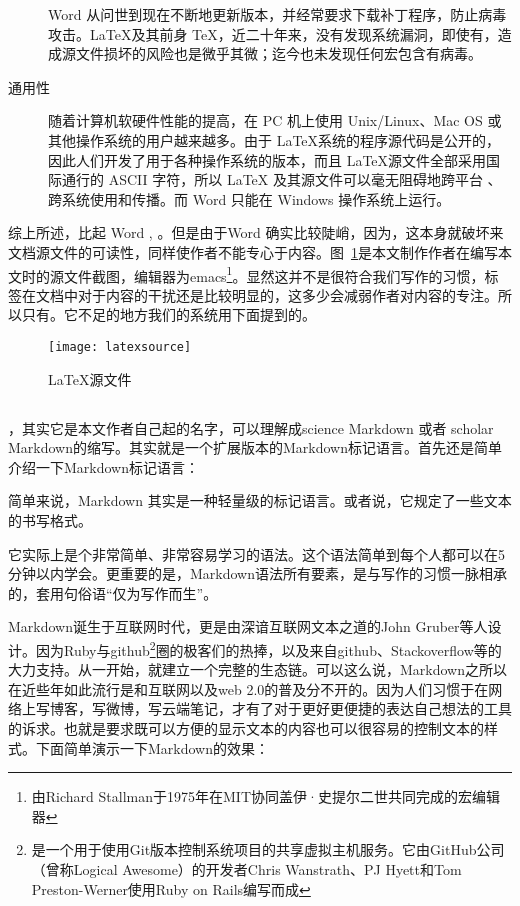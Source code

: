 \begin{description}
Word 从问世到现在不断地更新版本，并经常要求下载补丁程序，防止病毒攻击。\LaTeX 及其前身 \TeX，近二十年来，没有发现系统漏洞，即使有，造成源文件损坏的风险也是微乎其微；迄今也未发现任何宏包含有病毒。
\item[通用性] 随着计算机软硬件性能的提高，在 PC 机上使用 Unix/Linux、Mac OS 或其他操作系统的用户越来越多。由于 \LaTeX 系统的程序源代码是公开的，因此人们开发了用于各种操作系统的版本，而且 \LaTeX 源文件全部采用国际通行的 ASCII 字符，所以 LaTeX 及其源文件可以毫无阻碍地跨平台 、跨系统使用和传播。而 Word 只能在 Windows 操作系统上运行。
\end{description}
综上所述，比起 Word , 。但是由于 Word 确实比较陡峭，因为，这本身就破坏来文档源文件的可读性，同样使作者不能专心于内容。图~\ref{fig:xfig6}是本文制作作者在编写本文时的源文件截图，编辑器为emacs\footnote{由Richard Stallman于1975年在MIT协同盖伊·史提尔二世共同完成的宏编辑器}。显然这并不是很符合我们写作的习惯，标签在文档中对于内容的干扰还是比较明显的，这多少会减弱作者对内容的专注。所以只有。它不足的地方我们的系统用下面提到的。
\begin{figure}[H]
  \centering
  \texttt{[image: latexsource]}
  \caption{LaTeX源文件}
  \label{fig:xfig6}
\end{figure}

\subsection{\smarkdown}
\label{sec:smarkdown}

，其实它是本文作者自己起的名字，可以理解成science Markdown 或者 scholar Markdown的缩写。其实就是一个扩展版本的Markdown标记语言。首先还是简单介绍一下Markdown\cite{abari2012reproducible,rantakari2011adapting}标记语言：

简单来说，Markdown 其实是一种轻量级的标记语言。或者说，它规定了一些文本的书写格式。

它实际上是个非常简单、非常容易学习的语法。这个语法简单到每个人都可以在5分钟以内学会。更重要的是，Markdown语法所有要素，是与写作的习惯一脉相承的，套用句俗语“仅为写作而生”。

Markdown诞生于互联网时代，更是由深谙互联网文本之道的John Gruber等人设计。因为Ruby与github\footnote{是一个用于使用Git版本控制系统项目的共享虚拟主机服务。它由GitHub公司（曾称Logical Awesome）的开发者Chris Wanstrath、PJ Hyett和Tom Preston-Werner使用Ruby on Rails编写而成}圈的极客们的热捧，以及来自github、Stackoverflow等的大力支持。从一开始，就建立一个完整的生态链。可以这么说，Markdown之所以在近些年如此流行是和互联网以及web 2.0的普及分不开的。因为人们习惯于在网络上写博客，写微博，写云端笔记，才有了对于更好更便捷的表达自己想法的工具的诉求。也就是要求既可以方便的显示文本的内容也可以很容易的控制文本的样式。下面简单演示一下Markdown的效果：

